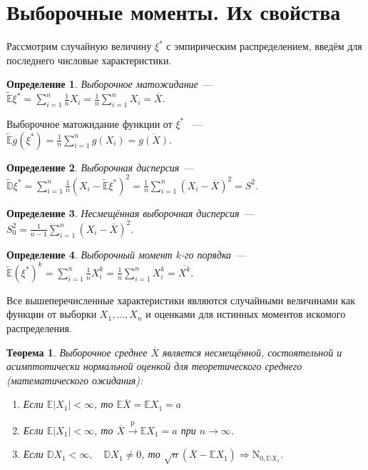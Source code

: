 \documentclass[oneside,final,14pt]{extreport}
\newtheorem{thm}{Теорема}[section]
\theoremstyle{definition}
\newtheorem{defn}{Определение}[section]
\begin{document}
\section{Выборочные моменты. Их свойства}

Рассмотрим случайную величину \( \xi^{*} \) с эмпирическим распределением, введём для последнего числовые характеристики.

\begin{defn}
{\it Выборочное матожидание}~--- \( \tilde{\mathbb{E}} \xi^{*}=\sum_{i=1}^{n} \frac{1}{n} X_{i}=\frac{1}{n} \sum_{i=1}^{n} X_{i}=\overline{X} \).

Выборочное матожидание функции от \( \xi^{*} \) ~--- \( \tilde{\mathbb{E}} g\left(\xi^{*}\right)=\frac{1}{n} \sum_{i=1}^{n} g\left(X_{i}\right)=\overline{g(X)} \).
\end{defn}

\begin{defn}
{\it Выборочная дисперсия}~--- \( \tilde{\mathbb{D}} \xi^{*}=\sum_{i=1}^{n} \frac{1}{n}(X_{i}-\tilde{\mathbb{E}} \xi^{*})^{2}=\frac{1}{n} \sum_{i=1}^{n}(X_{i}-\overline{X})^{2}=S^{2} \).
\end{defn}

\begin{defn}
{\it Несмещённая выборочная дисперсия}~--- \( S_{0}^{2}=\frac{1}{n-1} \sum_{i=1}^{n}\left(X_{i}-\overline{X}\right)^{2} \).
\end{defn}

\begin{defn}
{\it Выборочный момент \( k \)-го порядка}~--- \( \tilde{\mathbb{E}}(\xi^{*})^{k}=\sum_{i=1}^{n} \frac{1}{n} X_{i}^{k}=\frac{1}{n} \sum_{i=1}^{n} X_{i}^{k}=\overline{X^{k}} \).
\end{defn}

Все вышеперечисленные характеристики являются случайными величинами как функции от выборки \( X_{1}, \ldots, X_{n} \) и оценками для истинных моментов искомого распределения.

\begin{thm}
Выборочное среднее \( \overline{X} \) является несмещённой, состоятельной и асимптотически нормальной оценкой для теоретического среднего (математического ожидания):

\begin{enumerate}[label={\arabic*.}]
    \item Если \( \mathbb{E}|X_{1}|<\infty \), то \( \mathbb{E}\overline{X}=\mathbb{E} X_{1}=a \)
    \item Если \( \mathbb{E}|X_{1}|<\infty \), то \(\overline{X} \stackrel{\mathrm{p}}{\longrightarrow} \mathbb{E} X_{1}=a \) при \( n \rightarrow \infty \).
    \item Если \( \mathbb{D} X_{1}<\infty, \quad \mathbb{D} X_{1} \neq 0 \), то \( \sqrt{n}(\overline{X}-\mathbb{E} X_{1}) \Rightarrow \mathrm{N}_{0, \mathbb{D} X_{1}} \).
\end{enumerate}
\end{thm}
\end{document}
